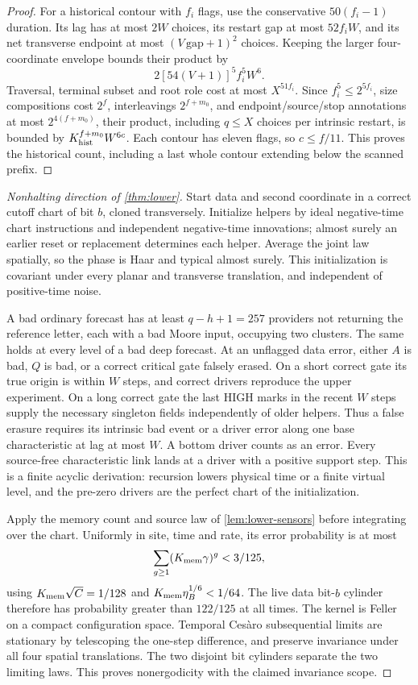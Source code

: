 \begin{proof}
For a historical contour with $f_i$ flags, use the conservative $50(f_i-1)$ duration. Its lag has at most $2W$ choices, its restart gap at most $52f_iW$, and its net transverse endpoint at most $(V\,\mathrm{gap}+1)^2$ choices. Keeping the larger four-coordinate envelope bounds their product by
\[
 2[54(V+1)]^5 f_i^5W^6.
\]
Traversal, terminal subset and root role cost at most $X^{51f_i}$. Since $f_i^5\le2^{5f_i}$, size compositions cost $2^f$, interleavings $2^{f+m_0}$, and endpoint/source/stop annotations at most $2^{4(f+m_0)}$, their product, including $q\le X$ choices per intrinsic restart, is bounded by $K_{\rm hist}^{f+m_0}W^{6c}$. Each contour has eleven flags, so $c\le f/11$. This proves the historical count, including a last whole contour extending below the scanned prefix.
\end{proof}

\begin{proof}[Nonhalting direction of \cref{thm:lower}]
Start data and second coordinate in a correct cutoff chart of bit $b$, cloned transversely. Initialize helpers by ideal negative-time chart instructions and independent negative-time innovations; almost surely an earlier reset or replacement determines each helper. Average the joint law spatially, so the phase is Haar and typical almost surely. This initialization is covariant under every planar and transverse translation, and independent of positive-time noise.

A bad ordinary forecast has at least $q-h+1=257$ providers not returning the reference letter, each with a bad Moore input, occupying two clusters. The same holds at every level of a bad deep forecast. At an unflagged data error, either $A$ is bad, $Q$ is bad, or a correct critical gate falsely erased. On a short correct gate its true origin is within $W$ steps, and correct drivers reproduce the upper experiment. On a long correct gate the last HIGH marks in the recent $W$ steps supply the necessary singleton fields independently of older helpers. Thus a false erasure requires its intrinsic bad event or a driver error along one base characteristic at lag at most $W$. A bottom driver counts as an error. Every source-free characteristic link lands at a driver with a positive support step. This is a finite acyclic derivation: recursion lowers physical time or a finite virtual level, and the pre-zero drivers are the perfect chart of the initialization.

Apply the memory count and source law of \cref{lem:lower-sensors} before integrating over the chart. Uniformly in site, time and rate, its error probability is at most
\[
 \sum_{g\ge1}(K_{\rm mem}\gamma)^g<3/125,
\]
using $K_{\rm mem}\sqrt C=1/128$ and $K_{\rm mem}\eta_B^{1/6}<1/64$. The live data bit-$b$ cylinder therefore has probability greater than $122/125$ at all times. The kernel is Feller on a compact configuration space. Temporal Ces\`aro subsequential limits are stationary by telescoping the one-step difference, and preserve invariance under all four spatial translations. The two disjoint bit cylinders separate the two limiting laws. This proves nonergodicity with the claimed invariance scope.
\end{proof}

